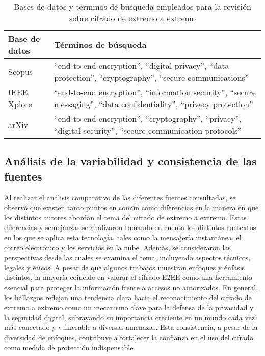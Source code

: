 \documentclass[spanish,12pt,a4paper]{article}
\begin{document}
	\begin{table}[ht]
		\centering
		\caption{Bases de datos y términos de búsqueda empleados para la revisión sobre cifrado de extremo a extremo}
		\label{tab:busqueda}
		\vspace{0.5cm}
		\begin{tabularx}{\textwidth}{l X}
			\hline
			\textbf{Base de datos} & \textbf{Términos de búsqueda} \\
			\hline
			Scopus & “end-to-end encryption”, “digital privacy”, “data protection”, “cryptography”, “secure communications” \\
			\hline
			IEEE Xplore & “end-to-end encryption”, “information security”, “secure messaging”, “data confidentiality”, “privacy protection” \\
			\hline
			arXiv & “end-to-end encryption”, “cryptography”, “privacy”, “digital security”, “secure communication protocols” \\
			\hline
		\end{tabularx}
	\end{table}
	
	
		
	\begin{multicols}{2}
		
		\subsection*{\normalsize Análisis de la variabilidad y consistencia de las fuentes }
		
		Al realizar el análisis comparativo de las diferentes fuentes consultadas, se observó que existen tanto puntos en común como diferencias en la manera en que los distintos autores abordan el tema del cifrado de extremo a extremo. Estas diferencias y semejanzas se analizaron tomando en cuenta los distintos contextos en los que se aplica esta tecnología, tales como la mensajería instantánea, el correo electrónico y los servicios en la nube. Además, se consideraron las perspectivas desde las cuales se examina el tema, incluyendo aspectos técnicos, legales y éticos. A pesar de que algunos trabajos muestran enfoques y énfasis distintos, la mayoría coincide en valorar el cifrado E2EE como una herramienta esencial para proteger la información frente a accesos no autorizados. En general, los hallazgos reflejan una tendencia clara hacia el reconocimiento del cifrado de extremo a extremo como un mecanismo clave para la defensa de la privacidad y la seguridad digital, subrayando su importancia creciente en un mundo cada vez más conectado y vulnerable a diversas amenazas. Esta consistencia, a pesar de la diversidad de enfoques, contribuye a fortalecer la confianza en el uso del cifrado como medida de protección indispensable.
	\end{multicols}
	\begin{multicols}{2}
		\printbibliography
	\end{multicols}
	
	
\end{document}
